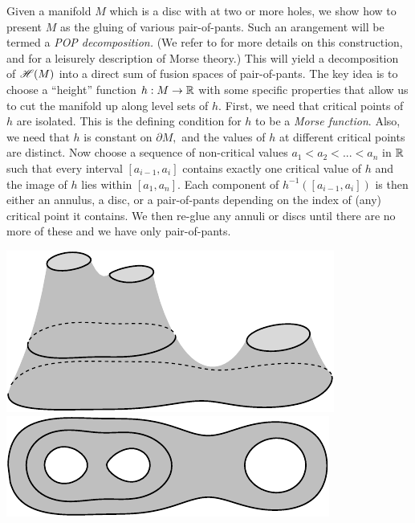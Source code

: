 \documentclass[aps, prl, letterpaper, twocolumn, superscriptaddress, notitlepage, 10pt]{revtex4-1}
\begin{document}
Given a manifold $M$ which is
a disc with at two or more holes, 
we show how to present $M$ as the gluing of various
pair-of-pants. Such an arangement will be termed a \emph{POP decomposition.}
(We refer to \cite{Ivanov2001} for more details on this construction,
and \cite{Ghrist2014} for a leisurely description of Morse theory.)
This will yield a decomposition of $\mathscr{H}(M)$ into a direct
sum of fusion spaces of pair-of-pants. %
The key idea is to choose a ``height'' function $h:M\to\mathbb{R}$
with some specific properties that allow us to
cut the manifold up along level sets of $h.$
First, we need that critical points of $h$ are isolated.
This is the defining condition for $h$ to be a \emph{Morse function}.
Also, we need that $h$ is constant on $\partial M,$
and the values of $h$ at different critical points are distinct.
Now choose a sequence of non-critical values $a_1<a_2<...<a_n$ in $\mathbb{R}$
such that every interval $[a_{i-1}, a_i]$ 
contains exactly one critical value of $h$ and the image
of $h$ lies within $[a_1, a_n].$
Each component of $h^{-1}([a_{i-1}, a_i])$ is then either
an annulus, a disc, or a pair-of-pants depending on the index of (any)
critical point it contains.
We then re-glue any annuli or discs until there are no more of these
and we have only pair-of-pants. 
\begin{center}
\includegraphics[]{pic-pants.pdf}\ \ \ \ \ \ \ \ \includegraphics[]{pic-pants-1.pdf}
\end{center}
\end{document}

